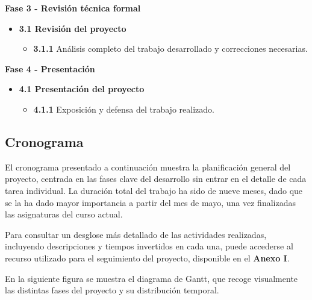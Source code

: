 \documentclass[a4paper, 11pt]{article}
\begin{document}
\vspace{0.5cm}
\textbf{\large Fase 3 - Revisión técnica formal} \vspace{0.5cm}

\begin{itemize}
    \item \textbf{3.1 Revisión del proyecto}
    \begin{itemize}
        \item \textbf{3.1.1} Análisis completo del trabajo desarrollado y correcciones necesarias.
    \end{itemize}
\end{itemize}

\vspace{0.5cm}
\textbf{\large Fase 4 - Presentación} \vspace{0.5cm}

\begin{itemize}
    \item \textbf{4.1 Presentación del proyecto}
    \begin{itemize}
        \item \textbf{4.1.1} Exposición y defensa del trabajo realizado.
    \end{itemize}
\end{itemize}


\subsection{Cronograma}
\par\vspace{0.5cm}

El cronograma presentado a continuación  muestra la planificación general del proyecto, centrada en las fases clave del desarrollo sin entrar 
en el detalle de cada tarea individual. La duración total del trabajo ha sido de nueve meses, dado que se la ha dado mayor importancia a 
partir del mes de mayo, una vez finalizadas las asignaturas del curso actual.
\par\vspace{0.5cm}
Para consultar un desglose más detallado de las actividades realizadas, incluyendo descripciones y tiempos invertidos en cada una, puede accederse al recurso utilizado para el seguimiento del proyecto, disponible en el \textbf{Anexo I}.

\par\vspace{0.5cm}

En la siguiente figura se muestra el diagrama de Gantt, que recoge visualmente las distintas fases del proyecto y su distribución temporal.
\end{document}
